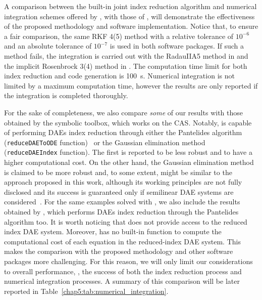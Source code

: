A comparison between the built-in joint index reduction algorithm and numerical integration schemes offered by \Maple{}, with those of \Indigo{}, will demonstrate the effectiveness of the proposed methodology and software implementation. Notice that, to ensure a fair comparison, the same \ac{RKF} 4(5) method with a relative tolerance of $10^{-6}$ and an absolute tolerance of $10^{-7}$ is used in both software packages. If such a method fails, the integration is carried out with the RadauIIA5 method in \Indigo{} and the implicit Rosenbrock 3(4) method in \Maple{}. The computation time limit for both index reduction and code generation is \SI{100}{\second}. Numerical integration is not limited by a maximum computation time, however the results are only reported if the integration is completed thoroughly.

For the sake of completeness, we also compare \emph{some} of our results with those obtained by the \Matlab{} symbolic toolbox, which works on the \MuPAD{} \ac{CAS}. Notably, \Matlab{} is capable of performing \acp{DAE} index reduction through either the Pantelides algorithm (\texttt{reduceDAEToODE} function)~\cite{pantelides1988consistent} or the Gaussian elimination method (\texttt{reduceDAEIndex} function). The first is reported to be less robust and to have a higher computational cost. On the other hand, the Gaussian elimination method is claimed to be more robust and, to some extent, might be similar to the approach proposed in this work, although its working principles are not fully disclosed and its success is guaranteed only if semilinear \ac{DAE} systems are considered~\cite{matlabdaes}. For the same examples solved with \Matlab{}, we also include the results obtained by \Mathematica{}, which performs \acp{DAE} index reduction through the Pantelides algorithm too. It is worth noticing that \Mathematica{} does not provide access to the reduced index \ac{DAE} system. Moreover, \Matlab{} has no built-in function to compute the computational cost of each equation in the reduced-index \ac{DAE} system. This makes the comparison with the proposed methodology and other software packages more challenging. For this reason, we will only limit our considerations to overall performance, \ie{}, the success of both the index reduction process and numerical integration processes. A summary of this comparison will be later reported in Table~\eqref{chap5:tab:numerical_integration}.

